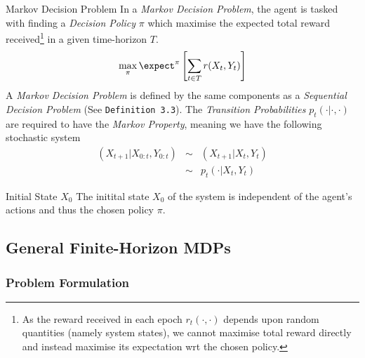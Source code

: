 \documentclass[11pt,a4paper]{article}
\begin{document}
  \begin{definition}{Markov Decision Problem}
    In a \textit{Markov Decision Problem}, the agent is tasked with finding a \textit{Decision Policy} $\pi$ which maximise the expected total reward received\footnote{As the reward received in each epoch $r_t(\cdot,\cdot)$ depends upon random quantities (namely system states), we cannot maximise total reward directly and instead maximise its expectation wrt the chosen policy.} in a given time-horizon $T$.
    \[ \max_\pi\expect^\pi\left[\sum_{t\in T}r(X_t,Y_t)\right] \]
    A \textit{Markov Decision Problem} is defined by the same components as a \textit{Sequential Decision Problem} (See \texttt{Definition 3.3}). The \textit{Transition Probabilities} $p_t(\cdot|\cdot,\cdot)$ are required to have the \textit{Markov Property}, meaning we have the following stochastic system
    \[\begin{array}{rcl}
      (X_{t+1}|X_{0:t},Y_{0:t})&\sim&(X_{t+1}|X_t,Y_t)\\
      &\sim&p_t(\cdot|X_t,Y_t)
    \end{array}\]
  \end{definition}

  \begin{remark}{Initial State $X_0$}
    The initital state $X_0$ of the system is independent of the agent's actions and thus the chosen policy $\pi$.
  \end{remark}

\subsection{General Finite-Horizon MDPs}

\subsubsection{Problem Formulation}
\end{document}
